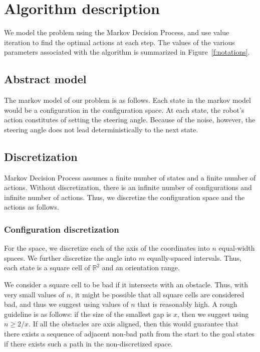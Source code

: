 \documentclass[a4paper]{article}
\begin{document}
\section{Algorithm description}
We model the problem using the Markov Decision Process, and use value iteration
to find the optimal actions at each step.
The values of the various parameters associated with the algorithm is
summarized in Figure~\ref{f:notations}.

\subsection{Abstract model}

The markov model of our problem is as follows. Each state in the markov model
would be a configuration in the configuration space. At each state, the robot's
action constitutes of setting the steering angle. Because of the noise, however,
the steering angle does not lead deterministically to the next state.

\subsection{Discretization}
Markov Decision Process assumes a finite number of states and a finite number
of actions. Without discretization, there is an infinite number of
configurations and infinite number of actions. Thus, we discretize the configuration
space and the actions as follows.

\subsubsection{Configuration discretization}
For the space, we discretize each of the axis of the coordinates into $n$
equal-width spaces. We further discretize the angle into $m$ equally-spaced
intervals. Thus, each state is a square cell of $\mathbb{R}^2$ and an orientation
range.

We consider a square cell to be bad if it intersects with an obstacle. Thus, with
very small values of $n$, it might be possible that all square cells are considered
bad, and thus we suggest using values of $n$ that is reasonably high. A rough
guideline is as follows: if the size of the smallest gap is $x$, then we
suggest using $n \ge 2/x$. If all the obstacles are axis aligned, then this
would guarantee that there exists a sequence of adjacent non-bad path from the
start to the goal states if there exists such a path in the non-discretized space.
\end{document}
